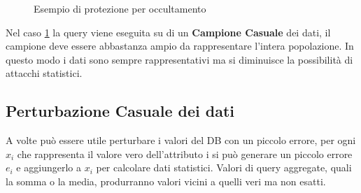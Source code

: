 \begin{figure}[htpb]
	\centering
		
				
		\caption{Esempio di protezione per occultamento
		  \label{fig:query_occultamento}}  

\end{figure}


Nel caso \ref{fig:query_occultamento} la query viene eseguita su di un \textbf{Campione Casuale} dei dati, il campione deve essere abbastanza ampio da rappresentare l'intera popolazione. In questo modo i dati sono sempre rappresentativi ma si diminuisce la possibilità di attacchi statistici.

\subsection{Perturbazione Casuale dei dati}
A volte può essere utile perturbare i valori del DB con un piccolo errore, per ogni $x_{i}$ che rappresenta il valore vero dell'attributo i si può generare un piccolo errore $e_{i}$ e aggiungerlo a $x_{i}$ per calcolare dati statistici.
Valori di query aggregate, quali la somma o la media, produrranno valori vicini a quelli veri ma non esatti.
